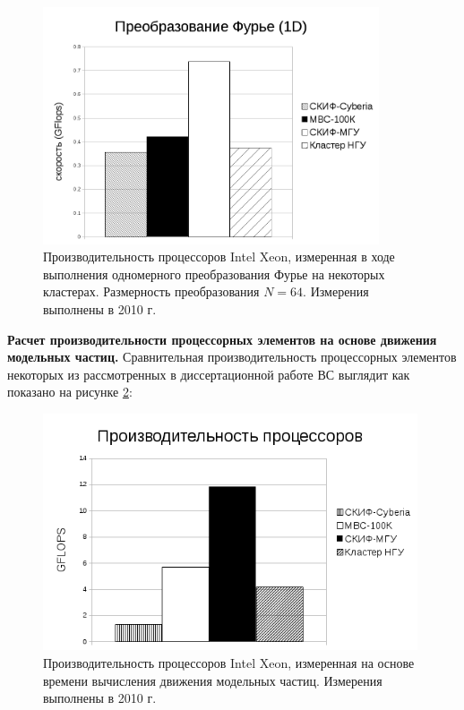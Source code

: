 \begin{figure}[htb]
	\begin{center}
		\includegraphics[height=7cm,keepaspectratio]{images/processor_FLOPS.png}
	\end{center}
	\caption{Производительность процессоров Intel Xeon, измеренная в ходе выполнения одномерного преобразования Фурье на некоторых кластерах. Размерность преобразования $N=64$. Измерения выполнены в 2010 г.}
	\label{procs_flops}
\end{figure}

\textbf{Расчет производительности процессорных элементов на основе движения модельных частиц.}
Сравнительная производительность процессорных элементов некоторых из рассмотренных в диссертационной работе ВС выглядит как показано на рисунке  \ref{procs_flops_pic}:

\begin{figure}[htb]
	\begin{center}
		\includegraphics[height=7cm,keepaspectratio]{images/processor_FLOPS_PIC.png}
	\end{center}
	\caption{Производительность процессоров Intel Xeon, измеренная на основе времени вычисления движения модельных частиц. Измерения выполнены в 2010 г.}
	\label{procs_flops_pic}
\end{figure} 


